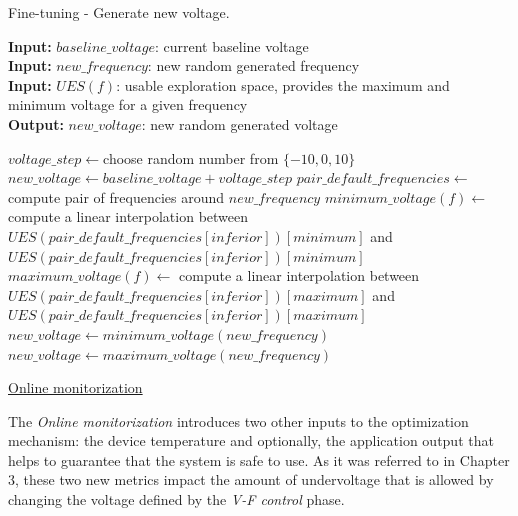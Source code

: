 \begin{algorithm}
\caption{Fine-tuning - Generate new voltage.}
    \label{alg:fine-voltage} 
    \hspace*{\algorithmicindent} \textbf{Input:} $baseline\_voltage$: current baseline voltage \\
 \hspace*{\algorithmicindent} \textbf{Input:} $new\_frequency$: new random generated frequency \\
 \hspace*{\algorithmicindent} \textbf{Input:} $UES(f)$: usable exploration space, provides the maximum and minimum voltage for a given frequency \\
 \hspace*{\algorithmicindent} \textbf{Output:} $new\_voltage$: new random generated voltage
\begin{algorithmic}
\STATE $voltage\_step \leftarrow $choose random number from $\{-10,0, 10\}$
\STATE $new\_voltage \leftarrow baseline\_voltage + voltage\_step$
\STATE $pair\_default\_frequencies \leftarrow $ compute pair of frequencies around $new\_frequency$
\STATE $minimum\_voltage(f) \leftarrow$ compute a linear interpolation between\\ 
\hspace*{\algorithmicindent}$UES(pair\_default\_frequencies[inferior])[minimum]$ and\\
\hspace*{\algorithmicindent}$UES(pair\_default\_frequencies[inferior])[minimum]$
\STATE $maximum\_voltage(f) \leftarrow$ compute a linear interpolation between\\
\hspace*{\algorithmicindent}$UES(pair\_default\_frequencies[inferior])[maximum]$ and\\
\hspace*{\algorithmicindent}$UES(pair\_default\_frequencies[inferior])[maximum]$
\STATE $new\_voltage \leftarrow minimum\_voltage(new\_frequency)$
\STATE $new\_voltage \leftarrow maximum\_voltage(new\_frequency)$
\ENDIF
\end{algorithmic}
\end{algorithm}

\bigskip
\noindent\underline{Online monitorization}
\bigskip

The \textit{Online monitorization} introduces two other inputs to the optimization mechanism: the device temperature and optionally, the application output that helps to guarantee that the system is safe to use. As it was referred to in Chapter 3, these two new metrics impact the amount of undervoltage that is allowed by changing the voltage defined by the \textit{V-F control} phase. 

